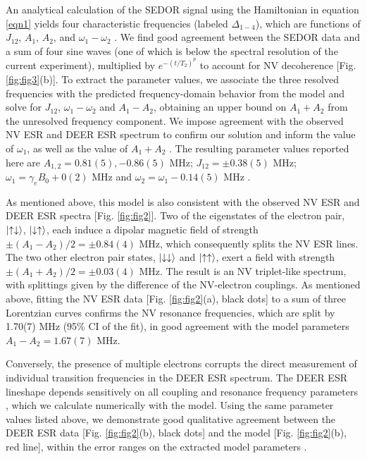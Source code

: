 \documentclass[%
 reprint,
 amsmath,amssymb,
 aps,
]{revtex4-1}
\begin{document}
An analytical calculation of the SEDOR signal using the Hamiltonian in equation \ref{eqn1} yields four characteristic frequencies (labeled $\Delta_{1-4}$), which are functions of $J_{12}$, $A_1$, $A_2$, and $\omega_1-\omega_2$ \cite{suppl}. We find good agreement between the SEDOR data and a sum of four sine waves (one of which is below the spectral resolution of the current experiment), multiplied by $e^{-(t/T_2)^p}$ to account for NV decoherence [Fig. \ref{fig:fig3}(b)]. To extract the parameter values, we associate the three resolved frequencies with the predicted frequency-domain behavior from the model \cite{suppl} and solve for $J_{12}$, $\omega_1-\omega_2$ and $A_1-A_2$, obtaining an upper bound on $A_1+A_2$ from the unresolved frequency component. We impose agreement with the observed NV ESR and DEER ESR spectrum to confirm our solution and inform the value of $\omega_1$, as well as the value of $A_1+A_2$ \cite{suppl}. The resulting parameter values reported here are $A_{1,2}=0.81(5),-0.86(5)\text{ MHz}$; $J_{12}=\pm0.38(5)\text{ MHz}$; $\omega_1=\gamma_eB_0+0(2)\text{ MHz}$ and $\omega_2=\omega_1-0.14(5)\text{ MHz}$ \cite{suppl}. 

As mentioned above, this model is also consistent with the observed NV ESR and DEER ESR spectra [Fig. \ref{fig:fig2}]. Two of the eigenstates of the electron pair, $\ket{\uparrow\downarrow}$, $\ket{\downarrow\uparrow}$, each induce a dipolar magnetic field of strength $\pm(A_{1}-A_{2})/2=\pm0.84(4)\text{ MHz}$, which consequently splits the NV ESR lines. The two other electron pair states, $\ket{\downarrow\downarrow}$ and $\ket{\uparrow\uparrow}$, exert a field with strength $\pm(A_{1}+A_{2})/2=\pm0.03(4)\text{ MHz}$. The result is an NV triplet-like spectrum, with splittings given by the difference of the NV-electron couplings. As mentioned above, fitting the NV ESR data [Fig. \ref{fig:fig2}(a), black dots] to a sum of three Lorentzian curves confirms the NV resonance frequencies, which are split by 1.70(7) MHz (95\% CI of the fit), in good agreement with the model parameters $A_{1}-A_{2}=1.67(7)\text{ MHz}$.

Conversely, the presence of multiple electrons corrupts the direct measurement of individual transition frequencies in the DEER ESR spectrum. The DEER ESR lineshape depends sensitively on all coupling and resonance frequency parameters \cite{suppl}, which we calculate numerically with the model. Using the same parameter values listed above, we demonstrate good qualitative agreement between the DEER ESR data [Fig. \ref{fig:fig2}(b), black dots] and the model [Fig. \ref{fig:fig2}(b), red line], within the error ranges on the extracted model parameters \cite{suppl}.
\end{document}
